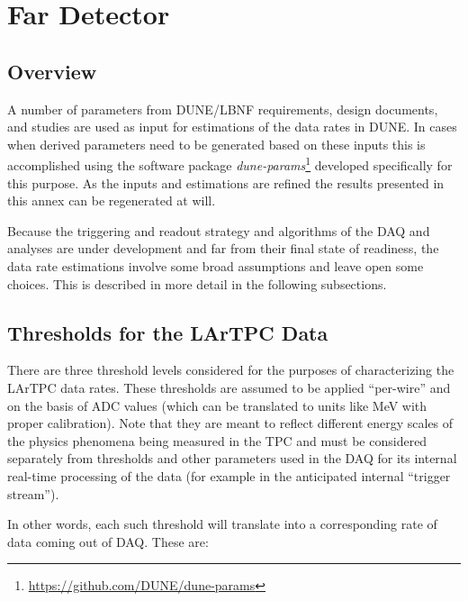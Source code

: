 \chapter{Far Detector}
\label{ch:annex-rate}

\section{Overview}

A number of parameters from DUNE/LBNF requirements, design documents,  and studies are used  as input
for estimations of the data rates in DUNE. In cases when derived parameters need to be generated based on these inputs
this is accomplished using the software package \textit{dune-params}\footnote{\url{https://github.com/DUNE/dune-params}}
developed specifically for this purpose.
As the inputs and estimations are refined the results presented in
this annex can be regenerated at will.

Because the triggering and readout strategy and algorithms of the DAQ and
analyses are under development and far from their final state of readiness,
the data rate estimations involve some broad assumptions and leave open some choices.
This is described in more detail in the following subsections.



\section{Thresholds for the LArTPC Data}

There are three threshold levels considered for the purposes of characterizing the LArTPC data rates.
These thresholds are assumed to be applied ``per-wire'' and on the basis of ADC values (which can be translated
to units like MeV with proper calibration).
Note that they are meant to reflect different energy scales of the physics phenomena being
measured in the TPC and  must be considered separately from thresholds and other parameters used  in the
DAQ for its internal real-time processing of the data (for example in the anticipated internal ``trigger stream'').

In other words, each such threshold will translate into a corresponding rate of data coming out of DAQ. These are:

